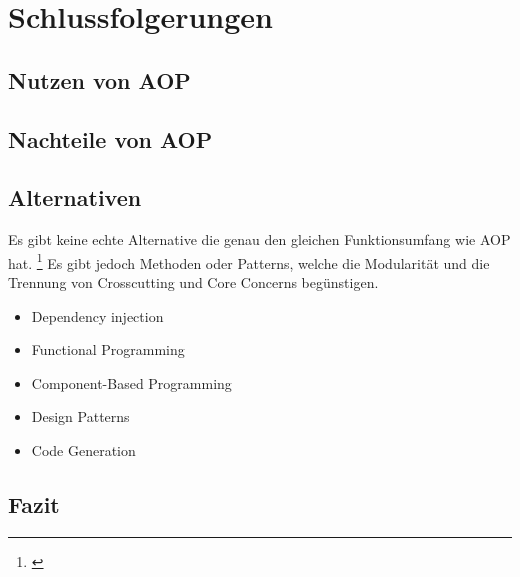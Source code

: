 \chapter{Schlussfolgerungen}
\label{chap:schlussfolgerungen}
\section{Nutzen von AOP}

\section{Nachteile von AOP}

\section{Alternativen}
Es gibt keine echte Alternative die genau den gleichen Funktionsumfang wie AOP hat. \footnote{\cite{bruce:alternatives}} Es gibt jedoch Methoden oder Patterns, welche die Modularität und die Trennung von Crosscutting und Core Concerns begünstigen.
\begin{itemize}
\item Dependency injection
\item Functional Programming
\item Component-Based Programming
\item Design Patterns
\item Code Generation
\end{itemize}

\section{Fazit}